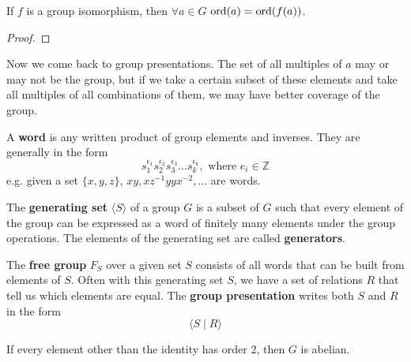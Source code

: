   \begin{theorem}
    If $f$ is a group isomorphism, then $\forall a \in G$ $\operatorname{ord}(a) = \operatorname{ord}(f(a))$. 
  \end{theorem}
  \begin{proof}
    
  \end{proof}

  Now we come back to group presentations. The set of all multiples of $a$ may or may not be the group, but if we take a certain subset of these elements and take all multiples of all combinations of them, we may have better coverage of the group. 

  \begin{definition}[Word]
    A \textbf{word} is any written product of group elements and inverses. They are generally in the form
    \begin{equation}
      s_{1}^{\epsilon_{1}} s_{2}^{\epsilon_{2}} s_{3}^{\epsilon_{3}}... s_{k}^{\epsilon_{k}}, \text{ where } e_i \in \mathbb{Z}
    \end{equation} 
    e.g. given a set $\{x,y,z\}$, $x y, x z^{-1} y y x^{-2},...$ are words. 
  \end{definition}

  \begin{definition}
    The \textbf{generating set} $\langle S \rangle$ of a group $G$ is a subset of $G$ such that every element of the group can be expressed as a word of finitely many elements under the group operations. The elements of the generating set are called \textbf{generators}.
  \end{definition}

  \begin{definition} 
    The \textbf{free group} $F_{S}$ over a given set $S$ consists of all words that can be built from elements of $S$. Often with this generating set $S$, we have a set of relations $R$ that tell us which elements are equal. The \textbf{group presentation} writes both $S$ and $R$ in the form 
    \begin{equation}
      \langle S \mid R \rangle
    \end{equation}
  \end{definition}

  \begin{theorem}
    If every element other than the identity has order 2, then $G$ is abelian. 
  \end{theorem}

